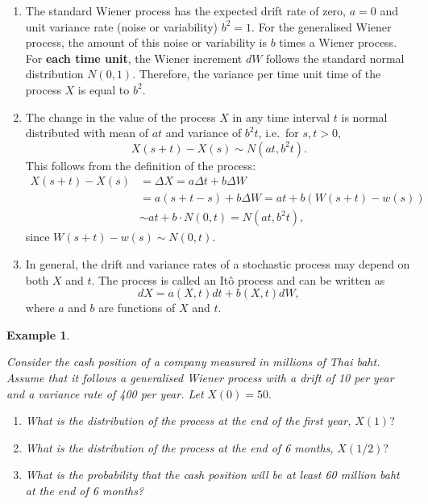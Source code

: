\documentclass[
]{book}
\theoremstyle{definition}
\theoremstyle{definition}
\newtheorem{example}{Example}[chapter]
\theoremstyle{definition}
\theoremstyle{definition}
\theoremstyle{remark}
\begin{document}
\begin{enumerate}
\def\labelenumi{\arabic{enumi}.}
\item
  The standard Wiener process has the expected drift rate of zero,
  \(a = 0\) and unit variance rate (noise or variability) \(b^2 = 1\). For
  the generalised Wiener process, the amount of this noise or
  variability is \(b\) times a Wiener process. For \textbf{each time unit},
  the Wiener increment \(dW\) follows the standard normal distribution
  \(N(0,1)\). Therefore, the variance per time unit time of the process
  \(X\) is equal to \(b^2\).
\item
  The change in the value of the process \(X\) in any time interval \(t\)
  is normal distributed with mean of \(at\) and variance of \(b^2 t\),
  i.e.~for \(s, t > 0\), \[X(s + t) - X(s) \sim N(at , b^2 t).\] This
  follows from the definition of the process: \[\begin{aligned}
    X(s + t) - X(s)   &= \Delta X  = a \Delta t + b \Delta W\\
                          &= a (s + t  - s) + b  \Delta W = a t + b (W(s + t) - w(s)) \\
                      &\sim at + b \cdot N(0, t) = N(at, b^2 t),\end{aligned}\]
  since \(W(s + t) - w(s) \sim N(0,t)\).
\item
  In general, the drift and variance rates of a stochastic process may
  depend on both \(X\) and \(t\). The process is called an Itô process and
  can be written as \[dX = a(X,t) dt + b(X,t) dW,\] where \(a\) and \(b\)
  are functions of \(X\) and \(t\).
\end{enumerate}

\begin{example}
\protect\hypertarget{exm:unlabeled-div-77}{}\label{exm:unlabeled-div-77}

\emph{Consider the cash position of a company measured in millions of Thai
baht. Assume that it follows a generalised Wiener process with a drift
of 10 per year and a variance rate of 400 per year. Let} \(X(0) = 50\).

\begin{enumerate}
\def\labelenumi{\arabic{enumi}.}
\item
  \emph{What is the distribution of the process at the end of the first
  year,} \(X(1)\)?
\item
  \emph{What is the distribution of the process at the end of 6 months,}
  \(X(1/2)\)?
\item
  \emph{What is the probability that the cash position will be at least 60
  million baht at the end of 6 months?}
\end{enumerate}

\end{example}
\end{document}
